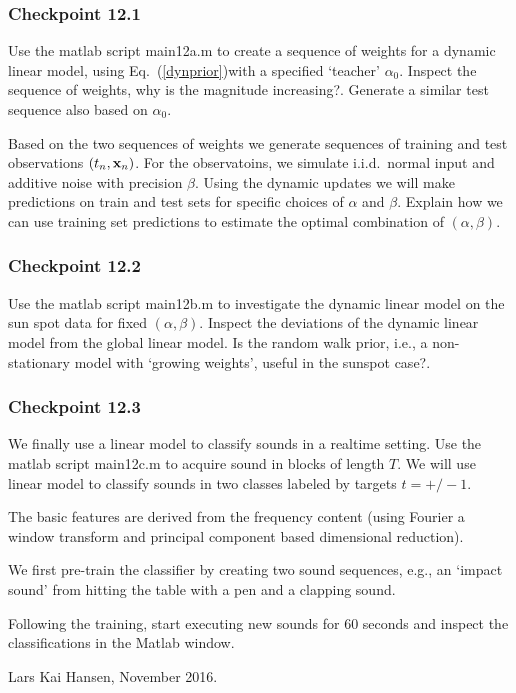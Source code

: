 \documentclass[A4,12pt]{article}    %
\def\xb{{\bf x}}
\def\xb{{\bf x}}
\begin{document}
\subsubsection*{Checkpoint 12.1}
Use the matlab script {\sf main12a.m} to create a sequence of weights for a dynamic linear model, using Eq.\ (\ref{dynprior})with a specified `teacher' $\alpha_0$. Inspect the sequence of weights, why is the magnitude increasing?. Generate a similar test sequence also based on  $\alpha_0$.

Based on the two sequences of weights we generate sequences of training and test observations $(t_n,\xb_n)$. For the observatoins, we simulate i.i.d.\ normal input and additive noise with precision $\beta$. Using the dynamic updates we will make predictions on train and test sets for specific choices of $\alpha$ and $\beta$. Explain how we can use training set predictions to estimate the optimal combination of $(\alpha, \beta)$.

\subsubsection*{Checkpoint 12.2}
Use the matlab script {\sf main12b.m} to investigate the dynamic linear model on the sun spot data for fixed  $(\alpha, \beta)$. Inspect the deviations of the dynamic linear model from the global linear model. Is the random walk prior, i.e., a non-stationary model with `growing weights', useful in the sunspot case?.

\subsubsection*{Checkpoint 12.3}
We finally use a linear model to classify sounds in a realtime setting. Use the matlab script {\sf main12c.m} to acquire sound in blocks of length $T$.
We will use linear model to classify sounds in two classes labeled by targets $t=+/- 1$.

The basic features are derived from the frequency content (using Fourier a window transform and principal component based dimensional reduction).

We first pre-train the classifier by creating two sound sequences, e.g., an `impact sound' from hitting the table with a pen and a clapping sound.

Following the training, start executing new sounds for 60 seconds  and inspect the classifications in the Matlab window.

\vspace*{2cm}

Lars Kai Hansen, November 2016.
\end{document}
